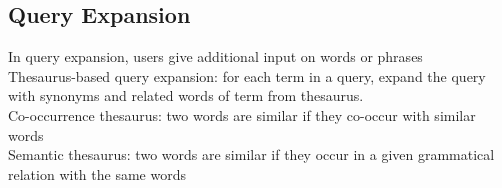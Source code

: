 \begin{multicols*}{2}
\section{Query Expansion}

\noindent In query expansion, users give additional input on words or phrases \\

\noindent Thesaurus-based query expansion: for each term in a query, expand the query with synonyms and related words of term from thesaurus. \\

\noindent Co-occurrence thesaurus: two words are similar if they co-occur with similar words \\

\noindent Semantic thesaurus: two words are similar if they occur in a given grammatical relation with the same words

\end{multicols*}
